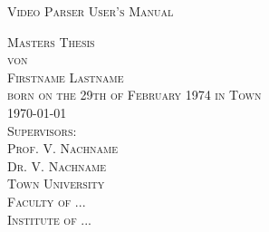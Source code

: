 

\begin{titlepage}

\begin{center}

\Large
\textsc{Video Parser User's Manual}\\

\vspace{5cm}

\textsc{Masters Thesis\\[0.5\baselineskip]
von\\[0.5\baselineskip]
Firstname Lastname\\
{\normalsize \textsc{born on the 29th of February 1974 in Town}}}\\

\vspace{5cm}
\textsc{\today}\\ %

\vspace{1cm}
\textsc{Supervisors:\\
Prof. V. Nachname\\
Dr. V. Nachname}\\

\vspace{1cm}
\textsc{Town University\\
Faculty of ...\\
Institute of ...}\\

\end{center}

\end{titlepage}
